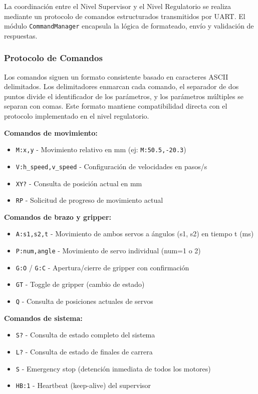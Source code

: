 La coordinación entre el Nivel Supervisor y el Nivel Regulatorio se realiza mediante un protocolo de comandos estructurados transmitidos por UART. El módulo \texttt{CommandManager} encapsula la lógica de formateado, envío y validación de respuestas.

\subsubsection{Protocolo de Comandos}

Los comandos siguen un formato consistente basado en caracteres ASCII delimitados. Los delimitadores enmarcan cada comando, el separador de dos puntos divide el identificador de los parámetros, y los parámetros múltiples se separan con comas. Este formato mantiene compatibilidad directa con el protocolo implementado en el nivel regulatorio.

\textbf{Comandos de movimiento:}
\begin{itemize}[label=$\bullet$]
    \item \texttt{M:x,y} - Movimiento relativo en mm (ej: \texttt{M:50.5,-20.3})
    \item \texttt{V:h\_speed,v\_speed} - Configuración de velocidades en pasos/s
    \item \texttt{XY?} - Consulta de posición actual en mm
    \item \texttt{RP} - Solicitud de progreso de movimiento actual
\end{itemize}

\textbf{Comandos de brazo y gripper:}
\begin{itemize}[label=$\bullet$]
    \item \texttt{A:s1,s2,t} - Movimiento de ambos servos a ángulos (s1, s2) en tiempo t (ms)
    \item \texttt{P:num,angle} - Movimiento de servo individual (num=1 o 2)
    \item \texttt{G:O} / \texttt{G:C} - Apertura/cierre de gripper con confirmación
    \item \texttt{GT} - Toggle de gripper (cambio de estado)
    \item \texttt{Q} - Consulta de posiciones actuales de servos
\end{itemize}

\textbf{Comandos de sistema:}
\begin{itemize}[label=$\bullet$]
    \item \texttt{S?} - Consulta de estado completo del sistema
    \item \texttt{L?} - Consulta de estado de finales de carrera
    \item \texttt{S} - Emergency stop (detención inmediata de todos los motores)
    \item \texttt{HB:1} - Heartbeat (keep-alive) del supervisor
\end{itemize}

